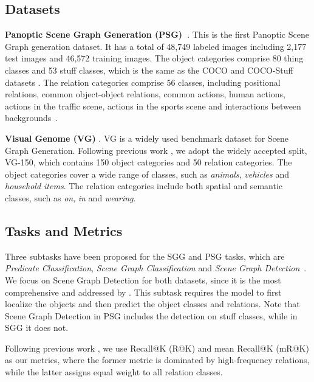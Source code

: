 
\subsection{Datasets}

\noindent \textbf{Panoptic Scene Graph Generation (PSG)~\cite{yang2022panoptic}}.
This is the first Panoptic Scene Graph generation dataset. It has a total of 48,749 labeled images including 2,177 test images and 46,572 training images.
The object categories comprise 80 thing classes and 53 stuff classes, which is the same as the COCO \cite{lin2014microsoft} and COCO-Stuff datasets \cite{caesar2018coco}.
The relation categories comprise 56 classes, including positional relations, common object-object relations, common actions, human actions, actions in the traffic scene, actions in the sports scene and interactions between backgrounds~\cite{yang2022panoptic}. 

\noindent \textbf{Visual Genome (VG)} \cite{krishna2017visual}.
VG is a widely used benchmark dataset for Scene Graph Generation.
Following previous work \cite{zellers2018neural, chen2019counterfactual}, we adopt the widely accepted split, VG-150, which contains 150 object categories and 50 relation categories.
The object categories cover a wide range of classes, such as \textit{animals}, \textit{vehicles} and \textit{household items}.
The relation categories include both spatial and semantic classes, such as \textit{on}, \textit{in} and \textit{wearing}.

\subsection{Tasks and Metrics}
Three subtasks have been proposed for the SGG and PSG tasks, which are \emph{Predicate Classification}, \emph{Scene Graph Classification} and \emph{Scene Graph Detection}~\cite{xu2017scene}.
We focus on Scene Graph Detection for both datasets, since it is the most comprehensive and addressed by \cite{yang2022panoptic}. This subtask
requires the model to first localize the objects and then predict the object classes and relations.
Note that Scene Graph Detection in PSG includes the detection on stuff classes, while in SGG it does not.

Following previous work \cite{tang2019learning, yu2020cogtree, yang2022panoptic}, we use Recall@K (R@K) and mean Recall@K (mR@K) as our metrics, where the former metric is dominated by high-frequency relations, while the latter assigns equal weight to all relation classes.

